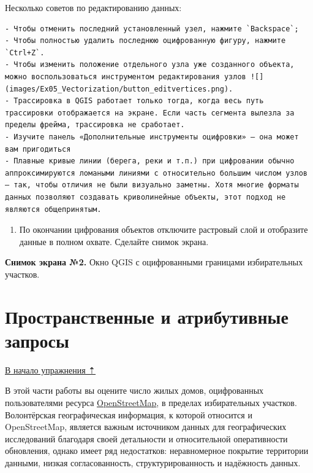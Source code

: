 \documentclass[
  12pt,
]{book}
\providecommand{\tightlist}{%
  \setlength{\itemsep}{0pt}\setlength{\parskip}{0pt}}
\begin{document}
Несколько советов по редактированию данных:

\begin{verbatim}
- Чтобы отменить последний установленный узел, нажмите `Backspace`;
- Чтобы полностью удалить последнюю оцифрованную фигуру, нажмите `Ctrl+Z`.
- Чтобы изменить положение отдельного узла уже созданного объекта, можно воспользоваться инструментом редактирования узлов ![](images/Ex05_Vectorization/button_editvertices.png).
- Трассировка в QGIS работает только тогда, когда весь путь трассировки отображается на экране. Если часть сегмента вылезла за пределы фрейма, трассировка не сработает.
- Изучите панель «Дополнительные инструменты оцифровки» — она может вам пригодиться
- Плавные кривые линии (берега, реки и т.п.) при цифровании обычно аппроксимируются ломаными линиями с относительно большим числом узлов — так, чтобы отличия не были визуально заметны. Хотя многие форматы данных позволяют создавать криволинейные объекты, этот подход не являются общепринятым.
\end{verbatim}

\begin{enumerate}
\def\labelenumi{\arabic{enumi}.}
\setcounter{enumi}{17}
\tightlist
\item
  По окончании цифрования объектов отключите растровый слой и отобразите данные в полном охвате. Сделайте снимок экрана.
\end{enumerate}

\textbf{Снимок экрана №2.} Окно QGIS с оцифрованными границами избирательных участков.

\hypertarget{digitizing-query}{%
\section{Пространственные и атрибутивные запросы}\label{digitizing-query}}

\protect\hyperlink{digitizingf-districts}{В начало упражнения ⇡}

В этой части работы вы оцените число жилых домов, оцифрованных пользователями ресурса \href{https://www.openstreetmap.org/}{OpenStreetMap}, в пределах избирательных участков. Волонтёрская географическая информация, к которой относится и OpenStreetMap, является важным источником данных для географических исследований благодаря своей детальности и относительной оперативности обновления, однако имеет ряд недостатков: неравномерное покрытие территории данными, низкая согласованность, структурированность и надёжность данных.
\end{document}

